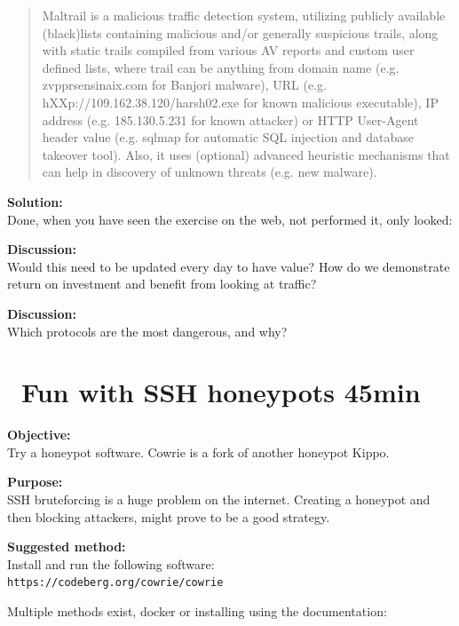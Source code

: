 \documentclass[a4paper,11pt,notitlepage]{report}
\begin{document}
\begin{quote}
  Maltrail is a malicious traffic detection system, utilizing publicly available (black)lists containing malicious and/or generally suspicious trails, along with static trails compiled from various AV reports and custom user defined lists, where trail can be anything from domain name (e.g. zvpprsensinaix.com for Banjori malware), URL (e.g. hXXp://109.162.38.120/harsh02.exe for known malicious executable), IP address (e.g. 185.130.5.231 for known attacker) or HTTP User-Agent header value (e.g. sqlmap for automatic SQL injection and database takeover tool). Also, it uses (optional) advanced heuristic mechanisms that can help in discovery of unknown threats (e.g. new malware).
\end{quote}


{\bf Solution:}\\
Done, when you have seen the exercise on the web, not performed it, only looked:

{\bf Discussion:}\\
Would this need to be updated every day to have value? How do we demonstrate return on investment and benefit from looking at traffic?



{\bf Discussion:}\\
Which protocols are the most dangerous, and why?


\chapter{\faInfoCircle\ Fun with SSH honeypots 45min}
\label{ex:ssh-honeypot}

{\bf Objective:}\\
Try a honeypot software. Cowrie is a fork of another honeypot Kippo.

{\bf Purpose:}\\
SSH bruteforcing is a huge problem on the internet. Creating a honeypot and then blocking attackers, might prove to be a good strategy.

{\bf Suggested method:}\\
Install and run the following software:\\
\verb+https://codeberg.org/cowrie/cowrie+

Multiple methods exist, docker or installing using the documentation:\\
\end{document}
